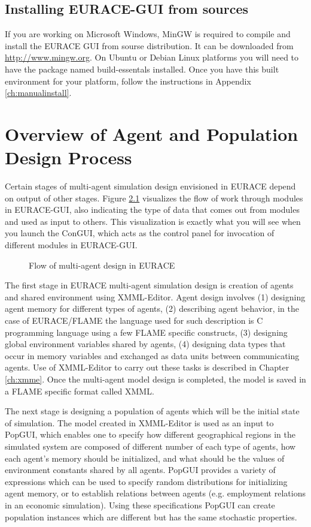 \documentclass[urop]{socreport}
\begin{document}
\section{Installing EURACE-GUI from sources}
If you are working on Microsoft Windows, MinGW is required to compile and install the EURACE GUI from sourse distribution. It can be downloaded from \url{http://www.mingw.org}. On Ubuntu or Debian Linux platforms you will need to have the package named build-essentals installed. Once you have this built environment for your platform, follow the instructions in Appendix \ref{ch:manualinstall}.

\chapter{Overview of Agent and Population Design Process}
\label{ch:overview}
Certain stages of multi-agent simulation design envisioned in EURACE depend on output of other stages. Figure \ref{fig:workflow} visualizes the flow of work through modules in EURACE-GUI, also indicating the type of data that comes out from modules and used as input to others. This visualization is exactly what you will see when you launch the ConGUI, which acts as  the control panel for invocation of different modules in EURACE-GUI.
\begin{figure}
\caption{Flow of multi-agent design in EURACE}
\label{fig:workflow}
\end{figure}

The first stage in EURACE multi-agent simulation design is creation of agents and shared environment using XMML-Editor. Agent design involves (1) designing agent memory for different types of agents, (2) describing agent behavior, in the case of EURACE/FLAME the language used for such description is C programming language using a few FLAME specific constructs, (3) designing global environment variables shared by agents, (4) designing data types that occur in memory variables and exchanged as data units between communicating agents. Use of XMML-Editor to carry out these tasks is described in Chapter \ref{ch:xmme}. Once the multi-agent model design is completed, the model is saved in a FLAME specific format called XMML. 

The next stage is designing a population of agents which will be the initial state of simulation. The model created in XMML-Editor is used as an input to PopGUI, which enables one to specify how different geographical regions in the simulated system are composed of different number of each type of agents, how each agent's memory should be initialized, and what should be the values of environment constants shared by all agents. PopGUI provides a variety of expressions which can be used to specify random distributions for initializing agent memory, or to establish relations between agents (e.g. employment relations in an economic simulation). Using these specifications PopGUI can create population instances which are different but has the same stochastic properties.
\end{document}
